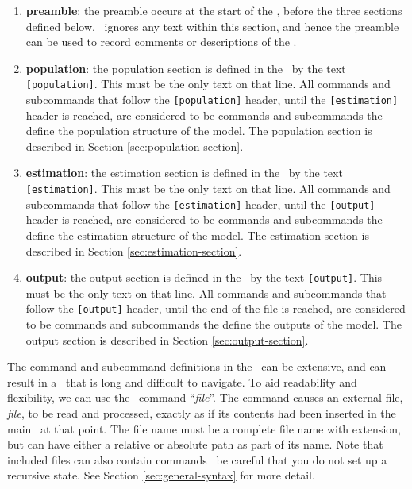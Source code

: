 \begin{enumerate}
\item \textbf{preamble}: 
the preamble occurs at the start of the \config, before the three sections defined below. \SPM\ ignores any text within this section, and hence the preamble can be used to record comments or descriptions of the \config. 

\item \textbf{population}: 
the population section is defined in the \config\ by the text \texttt{[population]}. This must be the only text on that line. All commands and subcommands that follow the \texttt{[population]} header, until the \texttt{[estimation]} header is reached, are considered to be commands and subcommands the define the population structure of the model. The population section is described in Section \ref{sec:population-section}.

\item \textbf{estimation}:
the estimation section is defined in the \config\ by the text \texttt{[estimation]}. This must be the only text on that line. All commands and subcommands that follow the \texttt{[estimation]} header, until the \texttt{[output]} header is reached, are considered to be commands and subcommands the define the estimation structure of the model.  The estimation section is described in Section \ref{sec:estimation-section}.

\item \textbf{output}:
the output section is defined in the \config\ by the text \texttt{[output]}. This must be the only text on that line. All commands and subcommands that follow the \texttt{[output]} header, until the end of the file is reached, are considered to be commands and subcommands the define the outputs of the model.  The output section is described in Section \ref{sec:output-section}.

\end{enumerate}

The command and subcommand definitions in the \config\ can be extensive, and can result in a \config\ that is long and difficult to navigate. To aid readability and flexibility, we can use the \config\ command  ``\emph{file}''. The command causes an external file, \emph{file}, to be read and processed, exactly as if its contents had been inserted in the main \config\ at that point. The file name must be a complete file name with extension, but can have either a relative or absolute path as part of its name. Note that included files can also contain  commands \textemdash\ be careful that you do not set up a recursive state. See Section \ref{sec:general-syntax} for more detail.

